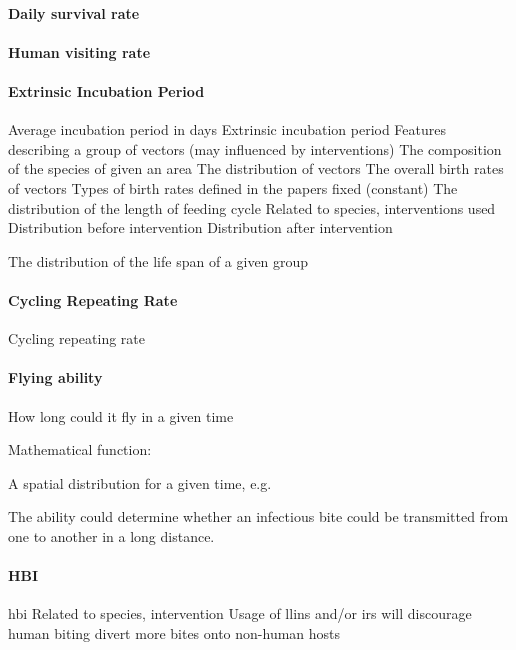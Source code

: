 \documentclass[a4paper, 12pt, twoside]{article}
\begin{document}

\paragraph{Daily survival rate}

\paragraph{Human visiting rate}

\paragraph{Extrinsic Incubation Period}
Average incubation period in days
Extrinsic incubation period
Features describing a group of vectors (may influenced by interventions)
The composition of the species of given an area
The distribution of vectors
The overall birth rates of vectors
Types of birth rates defined in the papers
fixed (constant)
The distribution of the length of feeding cycle
Related to species, interventions used
Distribution before intervention
Distribution after intervention

The distribution of the life span of a given group

\paragraph{Cycling Repeating Rate}
Cycling repeating rate

\paragraph{Flying ability}
How long could it fly in a given time

Mathematical function:

A spatial distribution for a given time, e.g.

The ability could determine whether an infectious bite could be transmitted from one to another in a long distance.

\paragraph{HBI}
\gls{hbi}
Related to species, intervention
Usage of \gls{llins} and/or \gls{irs} will discourage human biting divert more bites onto non-human hosts
\end{document}
